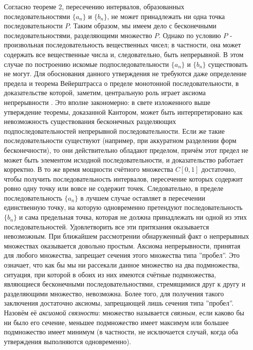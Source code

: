 \documentclass[12pt]{article}
\begin{document}
Согласно теореме 2, пересечению интервалов, образованных последовательностями $\{a_n\}$ и $\{b_n\}$, не может принадлежать ни одна точка последовательности $P$. Таким образом, мы имеем дело с бесконечными последовательностями, разделяющими множество $P$. Однако по условию $P$ - произвольная последовательность вещественных чисел; в частности, она может содержать все вещественные числа и, следовательно, быть непрерывной. В этом случае по построению искомые подпоследовательности $\{a_n\}$ и $\{b_n\}$ существовать не могут. Для обоснования данного утверждения не требуются даже определение предела и теорема Вейерштрасса о пределе монотонной последовательности, в доказательстве которой, заметим, центральную роль играет аксиома непрерывности \cite{matan-weierstrass}. Это вполне закономерно: в свете изложенного выше утверждение теоремы, доказанной Кантором, может быть интерпретировано как невозможность существования бесконечных разделяющих подпоследовательностей непрерывной последовательности. Если же такие последовательности существуют (например, при аккуратном разделении форм бесконечности), то они действительно обладают пределом, причём этот предел не может быть элементом исходной последовательности, и доказательство работает корректно. В то же время мощности счётного множества $C[0,1]$ достаточно, чтобы получить последовательность интервалов, пересечение которых содержит ровно одну точку или вовсе не содержит точек. Следовательно, в пределе последовательность $\{a_n\}$ в лучшем случае оставляет в пересечении единственную точку, на которую одновременно претендуют последовательность $\{b_n\}$ и сама предельная точка, которая не должна принадлежать ни одной из этих последовательностей. Удовлетворить все эти притязания оказывается невозможным. При ближайшем рассмотрении обнаруженный факт о непрерывных множествах оказывается довольно простым. Аксиома непрерывности, принятая для любого множества, запрещает сечения этого множества типа ''пробел''. Это означает, что как бы мы ни рассекали данное множество на два подмножества, ситуация, при которой в обоих из них имеются счётные подмножества, являющиеся бесконечными последовательностями, стремящимися друг к другу и разделяющими множество, невозможна. Более того, для получения такого заключения достаточно аксиомы, запрещающей лишь сечения типа ''пробел''. Назовём её {\it аксиомой связности}: множество называется {\it связным}, если каково бы ни было его сечение, меньшее подмножество имеет максимум или большее подмножество имеет минимум (в частности, не исключается случай, когда оба утверждения выполняются одновременно).
\end{document}

